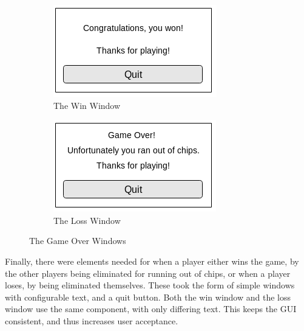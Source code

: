 \begin{figure}
    \centering
    \begin{subfigure}[h]{0.4\textwidth}
        \includegraphics[width=\textwidth]{../images/winscreen.png}
        \caption{The Win Window}%
        \label{fig:winwindow}
    \end{subfigure}
    \begin{subfigure}[h]{0.4\textwidth}
        \includegraphics[width=\textwidth]{../images/lossscreen.png}
        \caption{The Loss Window}%
        \label{fig:losswindow}
    \end{subfigure}
    \caption{The Game Over Windows}\label{fig:gameoverwindows}
\end{figure}

Finally, there were elements needed for when a player either wins the game,
by the other players being eliminated for running out of chips, or when a
player loses, by being eliminated themselves. These took the form of simple
windows with configurable text, and a quit button. Both the win window
and the loss window use the same component, with only differing text. This
keeps the GUI consistent, and thus increases user acceptance.

